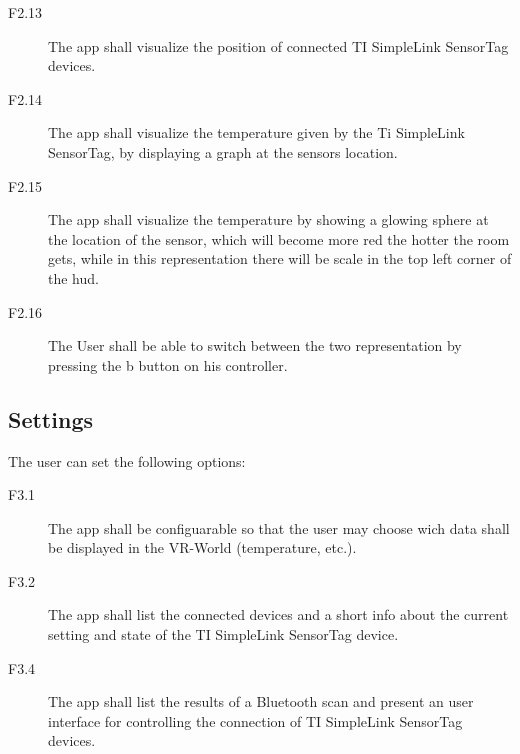 \begin{description}
    \item[F2.13] The app shall visualize the position of connected TI SimpleLink SensorTag devices.
    \item[F2.14] The app shall visualize the temperature given by the Ti SimpleLink SensorTag, by displaying a graph at the sensors location.
    \item[F2.15] The app shall visualize the temperature by showing a glowing sphere at the location of the sensor, which will become more red the hotter the room gets,
                while in this representation there will be scale in the top left corner of the hud.
    \item[F2.16] The User shall be able to switch between the two representation by pressing the b button on his controller.
  \end{description}



  \subsection{Settings}
    The user can set the following options:

    \begin{description}
      \item[F3.1] The app shall be configuarable so that the user may choose wich data shall be displayed in the VR-World (temperature, etc.).
      \item[F3.2] The app shall list the connected devices and a short info about the current setting and state of the TI SimpleLink SensorTag device.
      \item[F3.4] The app shall list the results of a Bluetooth scan and present an user interface for controlling the connection of TI SimpleLink SensorTag devices.
    \end{description}
